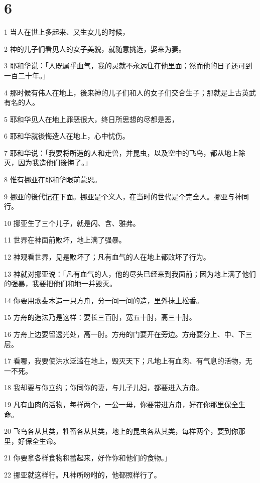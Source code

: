 \chapter{6}

\par 1 当人在世上多起来、又生女儿的时候，
\par 2 神的儿子们看见人的女子美貌，就随意挑选，娶来为妻。
\par 3 耶和华说：「人既属乎血气，我的灵就不永远住在他里面；然而他的日子还可到一百二十年。」
\par 4 那时候有伟人在地上，後来神的儿子们和人的女子们交合生子；那就是上古英武有名的人。
\par 5 耶和华见人在地上罪恶很大，终日所思想的尽都是恶，
\par 6 耶和华就後悔造人在地上，心中忧伤。
\par 7 耶和华说：「我要将所造的人和走兽，并昆虫，以及空中的飞鸟，都从地上除灭，因为我造他们後悔了。」
\par 8 惟有挪亚在耶和华眼前蒙恩。
\par 9 挪亚的後代记在下面。挪亚是个义人，在当时的世代是个完全人。挪亚与神同行。
\par 10 挪亚生了三个儿子，就是闪、含、雅弗。
\par 11 世界在神面前败坏，地上满了强暴。
\par 12 神观看世界，见是败坏了；凡有血气的人在地上都败坏了行为。
\par 13 神就对挪亚说：「凡有血气的人，他的尽头已经来到我面前；因为地上满了他们的强暴，我要把他们和地一并毁灭。
\par 14 你要用歌斐木造一只方舟，分一间一间的造，里外抹上松香。
\par 15 方舟的造法乃是这样：要长三百肘，宽五十肘，高三十肘。
\par 16 方舟上边要留透光处，高一肘。方舟的门要开在旁边。方舟要分上、中、下三层。
\par 17 看哪，我要使洪水泛滥在地上，毁灭天下；凡地上有血肉、有气息的活物，无一不死。
\par 18 我却要与你立约；你同你的妻，与儿子儿妇，都要进入方舟。
\par 19 凡有血肉的活物，每样两个，一公一母，你要带进方舟，好在你那里保全生命。
\par 20 飞鸟各从其类，牲畜各从其类，地上的昆虫各从其类，每样两个，要到你那里，好保全生命。
\par 21 你要拿各样食物积蓄起来，好作你和他们的食物。」
\par 22 挪亚就这样行。凡神所吩咐的，他都照样行了。

